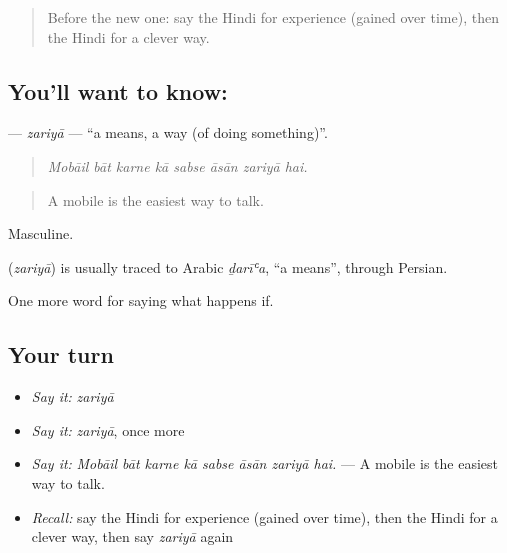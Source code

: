 \label{lesson:HI-C540-zariya}



\begin{quote}
Before the new one: say the Hindi for experience (gained over time), then the Hindi for a clever way.
\end{quote}

\subsection*{You'll want to know: }
\textbf{} — \emph{zariyā} — \textquotedblleft{}a means, a way (of doing something)\textquotedblright{}.

\begin{quote}
       
\end{quote}

\begin{quote}
\emph{Mobāil bāt karne kā sabse āsān zariyā hai.}
\end{quote}

\begin{quote}
A mobile is the easiest way to talk.
\end{quote}

Masculine.

\begin{cousinweb}
\textbf{} (\emph{zariyā}) is usually traced to Arabic \emph{ḏarīʿa}, \textquotedblleft{}a means\textquotedblright{}, through Persian.
\end{cousinweb}

\begin{grammarlens}[title={What you've built}]
One more word for saying what happens if.
\end{grammarlens}

\subsection*{Your turn}
\begin{itemize}
\raggedright
  \item \emph{Say it:} \emph{zariyā}
  \item \emph{Say it:} \emph{zariyā}, once more
  \item \emph{Say it:} \emph{Mobāil bāt karne kā sabse āsān zariyā hai.} — A mobile is the easiest way to talk.
  \item \emph{Recall:} say the Hindi for experience (gained over time), then the Hindi for a clever way, then say \emph{zariyā} again
\end{itemize}

